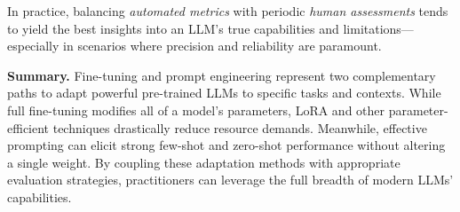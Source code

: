 \noindent
In practice, balancing \emph{automated metrics} with periodic \emph{human assessments} tends to yield the best insights into an LLM’s true capabilities and limitations—especially in scenarios where precision and reliability are paramount.

\bigskip
\noindent
\textbf{Summary.} Fine-tuning and prompt engineering represent two complementary paths to adapt powerful pre-trained LLMs to specific tasks and contexts. While full fine-tuning modifies all of a model’s parameters, LoRA and other parameter-efficient techniques drastically reduce resource demands. Meanwhile, effective prompting can elicit strong few-shot and zero-shot performance without altering a single weight. By coupling these adaptation methods with appropriate evaluation strategies, practitioners can leverage the full breadth of modern LLMs’ capabilities. 
